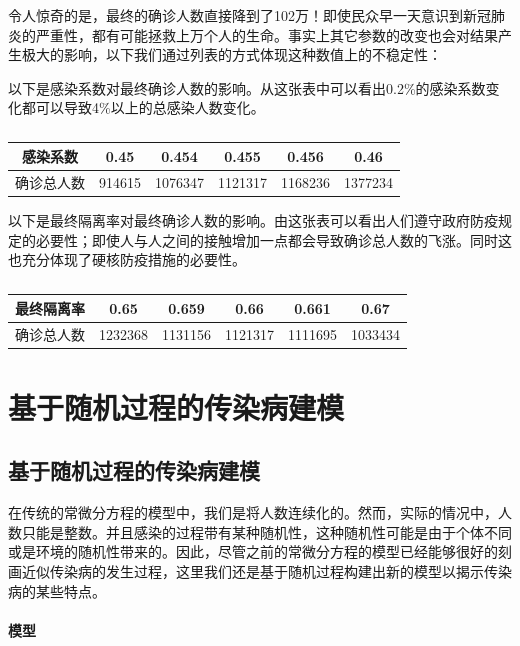 \documentclass[UTF8]{ctexart}
\begin{document}
				
				令人惊奇的是，最终的确诊人数直接降到了102万！即使民众早一天意识到新冠肺炎的严重性，都有可能拯救上万个人的生命。事实上其它参数的改变也会对结果产生极大的影响，以下我们通过列表的方式体现这种数值上的不稳定性：
				
				\indent 以下是感染系数对最终确诊人数的影响。从这张表中可以看出0.2\%的感染系数变化都可以导致4\%以上的总感染人数变化。
				
				\begin{table}[H]
					\centering
					\caption{}
					\begin{tabular}{|c|c|c|c|c|c|}
						\hline
						感染系数&0.45&0.454&0.455&0.456&0.46\\ \hline
						确诊总人数&914615&1076347&1121317&1168236&1377234\\
						\hline
					\end{tabular}
				\end{table}
				
				\indent 以下是最终隔离率对最终确诊人数的影响。由这张表可以看出人们遵守政府防疫规定的必要性；即使人与人之间的接触增加一点都会导致确诊总人数的飞涨。同时这也充分体现了硬核防疫措施的必要性。
				
				\begin{table}[H]
					\centering
					\caption{}
					\begin{tabular}{|c|c|c|c|c|c|}
						\hline
						最终隔离率&0.65&0.659&0.66&0.661&0.67\\ \hline
						确诊总人数&1232368&1131156&1121317&1111695&1033434\\
						\hline
					\end{tabular}
				\end{table}
	\section{基于随机过程的传染病建模}
	
		\subsection{基于随机过程的传染病建模}
			
			在传统的常微分方程的模型中，我们是将人数连续化的。然而，实际的情况中，人数只能是整数。并且感染的过程带有某种随机性，这种随机性可能是由于个体不同或是环境的随机性带来的。因此，尽管之前的常微分方程的模型已经能够很好的刻画近似传染病的发生过程，这里我们还是基于随机过程构建出新的模型以揭示传染病的某些特点。
			
			
			\paragraph{模型}
			
\end{document}
